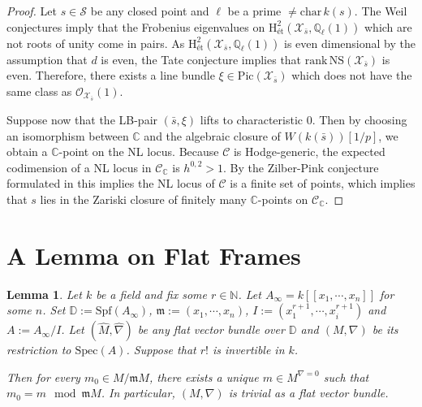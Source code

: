 \documentclass[letter, 11pt]{article}
\theoremstyle{plain}
\newtheorem{lemma}[subsubsection]{Lemma}
\theoremstyle{definition}
\newcommand{\IC}{\mathbb{C}}
\newcommand{\ID}{\mathbb{D}}
\newcommand{\IN}{\mathbb{N}}
\newcommand{\IQ}{\mathbb{Q}}
\newcommand{\sC}{\mathcal{C}}
\newcommand{\Spec}{\mathrm{Spec}}
\newcommand{\<}{\langle}
\renewcommand{\>}{\rangle}
\newcommand{\sX}{\mathcal{X}}
\newcommand{\sS}{\mathcal{S}}
\newcommand{\sO}{\mathcal{O}}
\newcommand{\Pic}{\mathrm{Pic}}
\renewcommand{\H}{\mathrm{H}}
\newcommand{\Spf}{\mathrm{Spf}}
\newcommand{\et}{\textrm{{\'e}t}}
\newcommand{\NS}{\mathrm{NS}}
\newcommand{\fm}{\mathfrak{m}}
\begin{document}
\begin{proof}
    Let $s \in \sS$ be any closed point and $\ell$ be a prime $\neq \mathrm{char\,} k(s)$. The Weil conjectures imply that the Frobenius eigenvalues on $\H^2_\et(\sX_{\bar{s}}, \IQ_\ell(1))$ which are not roots of unity come in pairs. As $\H^2_\et(\sX_{\bar{s}}, \IQ_\ell(1))$ is even dimensional by the assumption that $d$ is even, the Tate conjecture implies that $\mathrm{rank\,} \NS(\sX_{\bar{s}})$ is even. Therefore, there exists a line bundle $\xi \in \Pic(\sX_{\bar{s}})$ which does not have the same class as $\sO_{\sX_{\bar{s}}}(1)$. 

    Suppose now that the LB-pair $(\bar{s}, \xi)$ lifts to characteristic $0$. Then by choosing an isomorphism between $\IC$ and the algebraic closure of $W(k(\bar{s}))[1/p]$, we obtain a $\IC$-point on the NL locus. Because $\sC$ is Hodge-generic, the expected codimension of a NL locus in $\sC_{\IC}$ is $h^{0,2} > 1$. By the Zilber-Pink conjecture formulated in \cite[Conj. 2.5]{BKU} this implies the NL locus of $\sC$ is a finite set of points, which implies that $s$ lies in the Zariski closure of finitely many $\IC$-points on $\sC_\IC$. 
\end{proof}

\appendix

\section{A Lemma on Flat Frames}
\begin{lemma}
    Let $k$ be a field and fix some $r \in \IN$. Let $A_\infty = k[\![x_1, \cdots, x_n]\!]$ for some $n$. Set $\ID := \Spf(A_\infty)$, $\fm := (x_1, \cdots, x_n)$, $I := (x_1^{r + 1}, \cdots, x_i^{r + 1})$ and $A := A_\infty/I$. Let $(\hat{M}, \hat{\nabla})$ be any flat vector bundle over $\ID$ and $(M, \nabla)$ be its restriction to $\Spec(A)$. Suppose that $r!$ is invertible in $k$. 
    
    Then for every $m_0 \in M / \fm M$, there exists a unique $m \in M^{\nabla = 0}$ such that $m_0 = m \mod \fm M$. In particular, $(M, \nabla)$ is trivial as a flat vector bundle. 
\end{lemma} 
\end{document}
